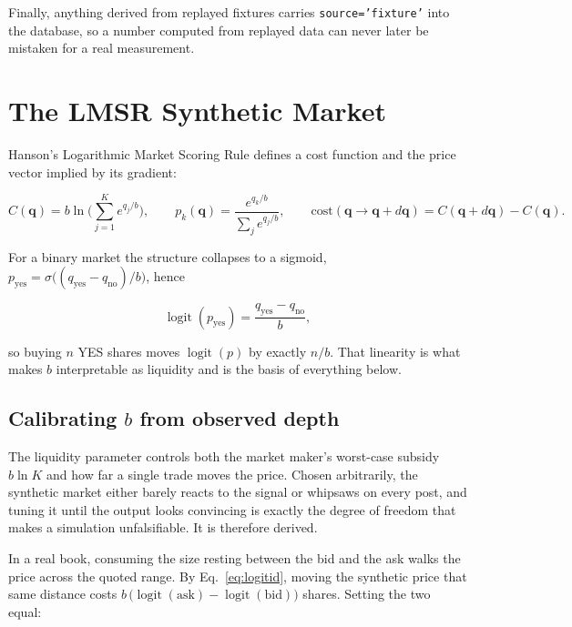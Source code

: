 \documentclass[11pt]{article}
\newcommand{\code}[1]{\texttt{\small #1}}
\begin{document}
Finally, anything derived from replayed fixtures carries \code{source='fixture'}
into the database, so a number computed from replayed data can never later be
mistaken for a real measurement.

\section{The LMSR Synthetic Market}
\label{sec:lmsr}

Hanson's Logarithmic Market Scoring Rule defines a cost function and the price
vector implied by its gradient:

\begin{equation}
C(\mathbf{q}) = b \ln\!\Big(\sum_{j=1}^{K} e^{q_j/b}\Big),
\qquad
p_k(\mathbf{q}) = \frac{e^{q_k/b}}{\sum_{j} e^{q_j/b}},
\qquad
\text{cost}(\mathbf{q} \to \mathbf{q}+d\mathbf{q}) = C(\mathbf{q}+d\mathbf{q}) - C(\mathbf{q}).
\end{equation}

For a binary market the structure collapses to a sigmoid,
$p_{\text{yes}} = \sigma\!\big((q_{\text{yes}} - q_{\text{no}})/b\big)$, hence

\begin{equation}
\operatorname{logit}(p_{\text{yes}}) = \frac{q_{\text{yes}} - q_{\text{no}}}{b},
\label{eq:logitid}
\end{equation}

so buying $n$ YES shares moves $\operatorname{logit}(p)$ by exactly $n/b$. That
linearity is what makes $b$ interpretable as liquidity and is the basis of
everything below.

\subsection{Calibrating $b$ from observed depth}

The liquidity parameter controls both the market maker's worst-case subsidy
$b \ln K$ and how far a single trade moves the price. Chosen arbitrarily, the
synthetic market either barely reacts to the signal or whipsaws on every post,
and tuning it until the output looks convincing is exactly the degree of freedom
that makes a simulation unfalsifiable. It is therefore derived.

In a real book, consuming the size resting between the bid and the ask walks the
price across the quoted range. By Eq.~\ref{eq:logitid}, moving the synthetic
price that same distance costs
$b\,\big(\operatorname{logit}(\text{ask}) - \operatorname{logit}(\text{bid})\big)$
shares. Setting the two equal:
\end{document}
